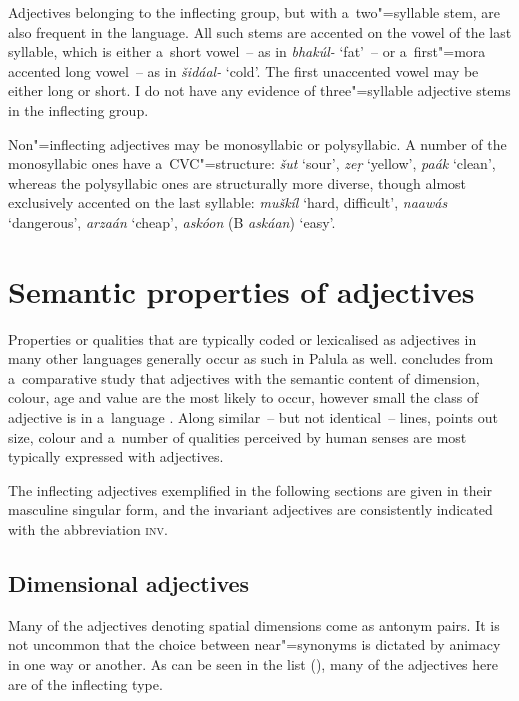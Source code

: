 Adjectives belonging to the inflecting group, but with a~two"=syllable stem, are also frequent in the language. All such stems are accented on the vowel of the last syllable, which is either a~short vowel~-- as in \textit{bhakúl-} `fat'~-- or a~first"=mora accented long vowel~-- as in \textit{šidáal-} `cold'. The first unaccented vowel may be either long or short. I do not have any evidence of three"=syllable adjective stems in the inflecting group.


Non"=inflecting adjectives may be monosyllabic or polysyllabic. A number of the monosyllabic ones have a~CVC"=structure: \textit{šut} `sour', \textit{zeṛ} `yellow', \textit{paák} `clean', whereas the polysyllabic ones are structurally more diverse, though almost exclusively accented on the last syllable: \textit{muškíl} `hard, difficult', \textit{naawás} `dangerous', \textit{arzaán} `cheap', \textit{askóon} (B \textit{askáan}) `easy'. 


\section{Semantic properties of adjectives}
\label{sec:6-2}

Properties or qualities that are typically coded or lexicalised as adjectives in many other languages generally occur as such in Palula as well. \citeauthor{dixon1982} concludes from a~comparative study that adjectives with the semantic content of dimension, colour, age and value are the most likely to occur, however small the class of adjective is in a~language \citep[46]{dixon1982}. Along similar~-- but not identical~-- lines, \citet[82]{givon2001a} points out size, colour and a~number of qualities perceived by human senses are most typically expressed with adjectives. 



The inflecting adjectives exemplified in the following sections are given in their masculine singular form, and the invariant adjectives are consistently indicated with the abbreviation \textsc{inv}.


\subsection{Dimensional adjectives}
\label{subsec:6-2-1}

Many of the adjectives denoting spatial dimensions come as antonym pairs. It is not uncommon that the choice between near"=synonyms is dictated by animacy in one way or another. As can be seen in the list (), many of the adjectives here are of the inflecting type.


